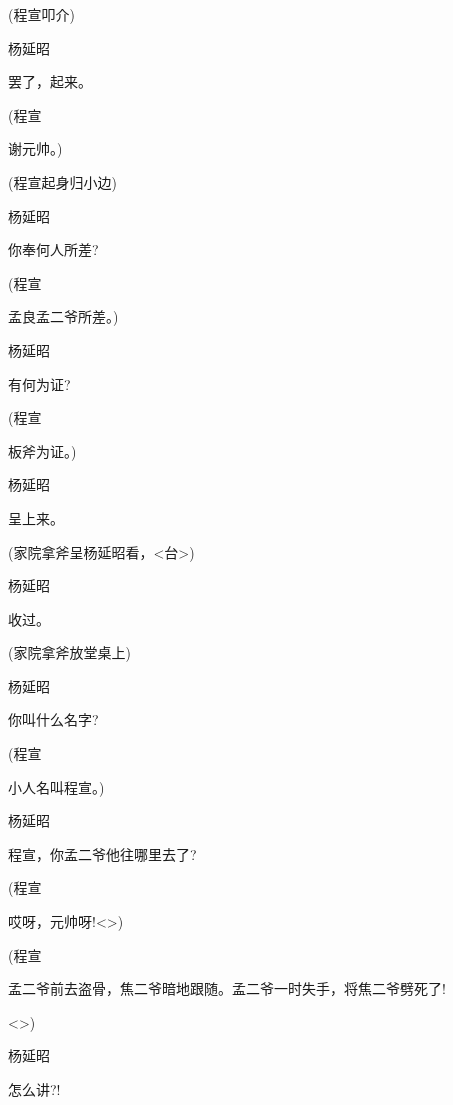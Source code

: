 {(程宣叩介)

杨延昭\hspace{20pt}~

罢了，起来。

(程宣\hspace{30pt}~

谢元帅。)

(程宣起身归小边)

杨延昭\hspace{20pt}~

你奉何人所差?

(程宣\hspace{30pt}~

孟良孟二爷所差。)

杨延昭\hspace{20pt}~

有何为证?

(程宣\hspace{30pt}~

板斧为证。)

杨延昭\hspace{20pt}~

呈上来。

(家院拿斧呈杨延昭看，{\textless{}台\textgreater{}})

杨延昭\hspace{20pt}~

收过。

(家院拿斧放堂桌上)

杨延昭\hspace{20pt}~

你叫什么名字?

(程宣\hspace{30pt}~

小人名叫程宣。)

杨延昭\hspace{20pt}~

程宣，你孟二爷他往哪里去了?

(程宣\hspace{30pt}~

哎呀，元帅呀!\textless{}\!\textgreater{})

(程宣\hspace{30pt}~

孟二爷前去盗骨，焦二爷暗地跟随。孟二爷一时失手，将焦二爷劈死了!

\textless{}\!\textgreater{})

杨延昭\hspace{20pt}~

怎么讲?!

}
